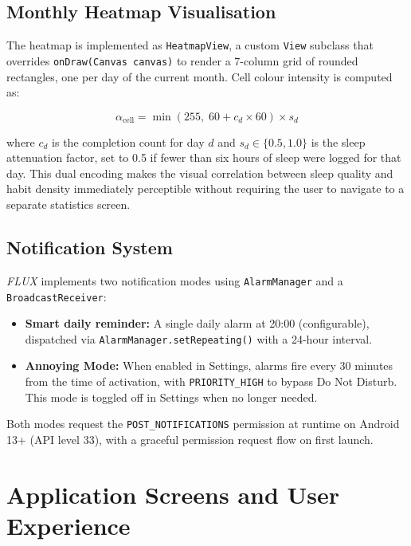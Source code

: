 \documentclass[12pt,a4paper]{article}
\newcommand{\FL}{\textit{FLUX}}
\begin{document}
\subsection{Monthly Heatmap Visualisation}

The heatmap is implemented as \texttt{HeatmapView}, a custom \texttt{View} subclass
that overrides \texttt{onDraw(Canvas canvas)} to render a 7-column grid of rounded
rectangles, one per day of the current month. Cell colour intensity is computed as:

\[
\alpha_{\text{cell}} = \min\!\left(255,\; 60 + c_d \times 60\right) \times s_d
\]

where $c_d$ is the completion count for day $d$ and $s_d \in \{0.5, 1.0\}$ is
the sleep attenuation factor, set to 0.5 if fewer than six hours of sleep were
logged for that day. This dual encoding makes the visual correlation between sleep
quality and habit density immediately perceptible without requiring the user to
navigate to a separate statistics screen.

\subsection{Notification System}

\FL{} implements two notification modes using \texttt{AlarmManager} and a
\texttt{BroadcastReceiver}:

\begin{itemize}[leftmargin=1.5em]
    \item \textbf{Smart daily reminder:} A single daily alarm at 20:00 (configurable),
    dispatched via \texttt{AlarmManager.setRepeating()} with a 24-hour interval.
    \item \textbf{Annoying Mode:} When enabled in Settings, alarms fire every
    30 minutes from the time of activation, with \texttt{PRIORITY\_HIGH} to bypass
    Do Not Disturb. This mode is toggled off in Settings when no longer needed.
\end{itemize}

Both modes request the \texttt{POST\_NOTIFICATIONS} permission at runtime on
Android 13+ (API level 33), with a graceful permission request flow on first launch.

\section{Application Screens and User Experience}
\end{document}
